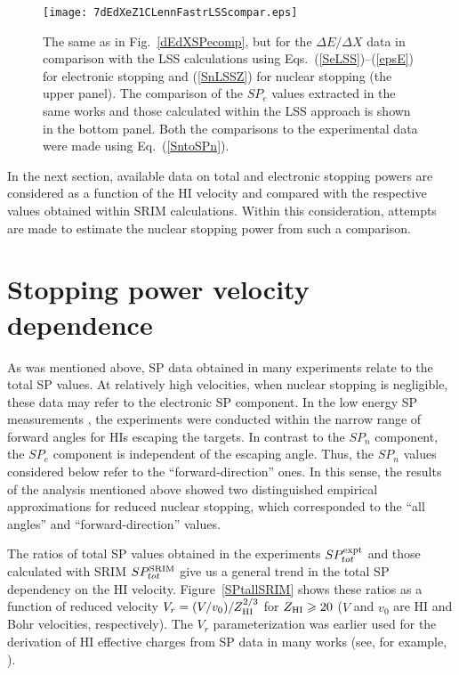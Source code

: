 \documentclass[aps,pra,twocolumn,amsmath,amssymb,floatfix]{revtex4-2}
\begin{document}
\begin{figure}[!hb]  %
\begin{center}
\texttt{[image: 7dEdXeZ1CLennFastrLSScompar.eps]}
\caption{\label{dEdXSPecomLSS} The same as in Fig.~\ref{dEdXSPecomp}, but for the $\Delta E/\Delta X$ data \cite{Fastrup66,Hvelp68,Lennard86} in comparison with the LSS calculations using Eqs.~(\ref{SeLSS})--(\ref{epsE}) for electronic stopping and (\ref{SnLSSZ}) for nuclear stopping (the upper panel). The comparison of the $SP_{e}$ values extracted in the same works and those calculated within the LSS approach is shown in the bottom panel. Both the comparisons to the experimental data were made using Eq.~(\ref{SntoSPn}).}
\end{center}
\end{figure}

In the next section, available data on total and electronic stopping powers are considered as a function of the HI velocity and compared with the respective values obtained within SRIM calculations. Within this consideration, attempts are made to estimate the nuclear stopping power from such a comparison.


\section{\label{totSP}Stopping power velocity dependence}

As was mentioned above, SP data obtained in many experiments relate to the total SP values. At relatively high velocities, when nuclear stopping is negligible, these data may refer to the electronic SP component.  In the low energy SP measurements \cite{Fastrup66,Hvelp68,Lennard86}, the experiments were conducted within the narrow range of forward angles for HIs escaping the targets. In contrast to the $SP_{n}$ component, the $SP_{e}$ component is independent of the escaping angle. Thus, the $SP_{n}$ values considered below refer to the ``forward-direction'' ones. In this sense, the results of the analysis \cite{Garnir80} mentioned above showed two distinguished empirical approximations for reduced nuclear stopping, which corresponded to the ``all angles'' and ``forward-direction'' values.

The ratios of total SP values obtained in the experiments $SP_{tot}^{\rm expt}$ \cite{SRIM,IAEASP} and those calculated with SRIM $SP_{tot}^{\rm SRIM}$ \cite{SRIM} give us a general trend in the total SP dependency on the HI velocity. Figure~\ref{SPtallSRIM} shows these ratios as a function of reduced velocity $V_{r} = (V/v_{0}) / Z^{2/3}_{\rm HI}$ for $Z_{\rm HI} \geqslant 20$ ($V$ and $v_{0}$ are HI and Bohr velocities, respectively). The $V_{r}$ parameterization was earlier used for the derivation of HI effective charges from SP data in many works (see, for example,  \cite{BrownMoak72,Pape78,AnthLanf82,SchulzBrandt82,Abdess92,Saga2015}).
\end{document}
